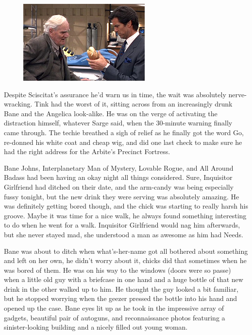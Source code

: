 \begin{figure}
	\begin{center}
		\includegraphics[width=\figwidth]{pics/19/37.png}
	\end{center}
\end{figure}
Despite Sciscitat's assurance he'd warn us in time, the wait was absolutely nerve-wracking. 
Tink had the worst of it, sitting across from an increasingly drunk Bane and the Angelica look-alike. 
He was on the verge of activating the distraction himself, whatever Sarge said, when the 30-minute warning finally came through. 
The techie breathed a sigh of relief as he finally got the word Go, re-donned his white coat and cheap wig, and did one last check to make sure he had the right address for the Arbite's Precinct Fortress.

Bane Johns, Interplanetary Man of Mystery, Lovable Rogue, and All Around Badass had been having an okay night all things considered. 
Sure, Inquisitor Girlfriend had ditched on their date, and the arm-candy was being especially fussy tonight, but the new drink they were serving was absolutely amazing. 
He was definitely getting bored though, and the chick was starting to really harsh his groove. 
Maybe it was time for a nice walk, he always found something interesting to do when he went for a walk. 
Inquisitor Girlfriend would nag him afterwards, but she never stayed mad, she understood a man as awesome as him had Needs. 


Bane was about to ditch when what's-her-name got all bothered about something and left on her own, he didn't worry about it, chicks did that sometimes when he was bored of them. 
He was on his way to the windows (doors were so passe) when a little old guy with a briefcase in one hand and a huge bottle of that new drink in the other walked up to him. 
He thought the guy looked a bit familiar, but he stopped worrying when the geezer pressed the bottle into his hand and opened up the case. 
Bane eyes lit up as he took in the impressive array of gadgets, beautiful pair of autoguns, and reconnaissance photos featuring a sinister-looking building and a nicely filled out young woman.

